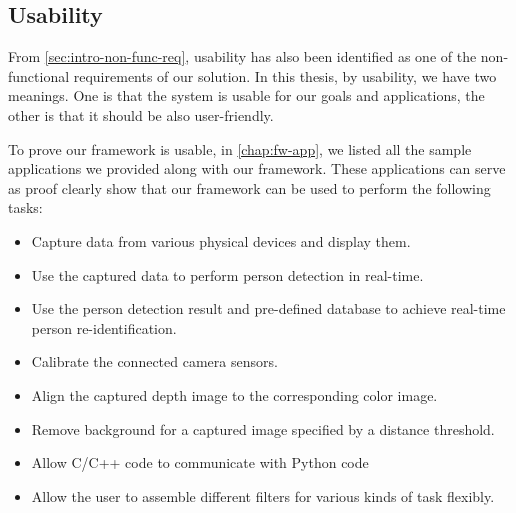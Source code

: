 \subsection{Usability}
\label{sec:Eval-framework-usab}

From \autoref{sec:intro-non-func-req}, usability has also been identified as 
one of the non-functional requirements of our solution. 
In this thesis, by usability, we have two meanings. One is that the system is
usable for our goals and applications, the other is that it should be also 
user-friendly.

To prove our framework is usable, in \autoref{chap:fw-app}, we
listed all the sample applications we provided along with our framework.
These applications can serve as proof clearly show that our framework can
be used to perform the following tasks:

\begin{itemize}
    \item Capture data from various physical devices and display them.
    \item Use the captured data to perform person detection in real-time.
    \item Use the person detection result and pre-defined database to achieve
          real-time person re-identification.
    \item Calibrate the connected camera sensors.
    \item Align the captured depth image to the corresponding color image.
    \item Remove background for a captured image specified by a distance
          threshold.
    \item Allow C/C++ code to communicate with Python code
    \item Allow the user to assemble different filters for various kinds of
          task flexibly.
\end{itemize}

